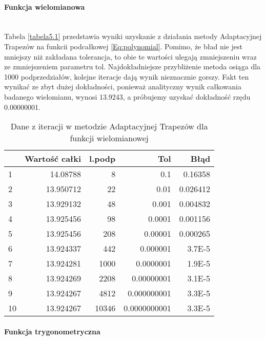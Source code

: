 \documentclass[12pt,twoside]{article}
\begin{document}
\paragraph{Funkcja wielomianowa}\mbox{} \\

Tabela \eqref{tabela5.1} przedstawia wyniki uzyskanie z działania metody Adaptacyjnej Trapezów na funkcii podcałkowej \eqref{Eq:polynomial}. Pomimo, że bład nie jest mniejszy niż zakładana tolerancja, to obie te wartości ulegają zmniejszeniu wraz ze zmniejszeniem parametru tol. Najdokładniejsze przybliżenie metoda osiąga dla 1000 podprzedziałów, kolejne iteracje dają wynik nieznacznie gorszy. Fakt ten wynikać ze zbyt dużej dokładności, ponieważ analityczny wynik całkowania badanego wielomianu, wynosi 13.9243, a próbujemy uzyskać dokładność rzędu 0.00000001.

\begin{table}[H]
\centering 
\caption{Dane z iteracji w metodzie Adaptacyjnej Trapezów dla funkcji wielomianowej}
\label{tabela5.1}
\begin{tabular}{lrrrr}
\toprule
{} &  Wartość całki &  l.podp &  Tol &      Błąd \\
\midrule
1 &       14.08788 &  8  &   0.1 & 0.16358\\
2 &       13.950712 &  22 &   0.01 & 0.026412\\
3 &       13.929132 &  48  &  0.001 & 0.004832 \\
4 &       13.925456 &  98  &  0.0001  & 0.001156 \\
5 &       13.925456 &  208  &  0.00001  &  0.000265 \\
6 &       13.924337 &  442  &  0.000001  & 3.7E-5 \\
7 &       13.924281 &  1000  &  0.0000001  & 1.9E-5 \\
8 &       13.924269 &  2208  &  0.00000001  & 3.1E-5 \\
9 &       13.924267 &  4812  &  0.000000001  & 3.3E-5 \\
10 &       13.924267 &  10346  &  0.0000000001  & 3.3E-5 \\
\bottomrule
\end{tabular}
\end{table}

\paragraph{Funkcja trygonometryczna}\mbox{} \\
\end{document}
